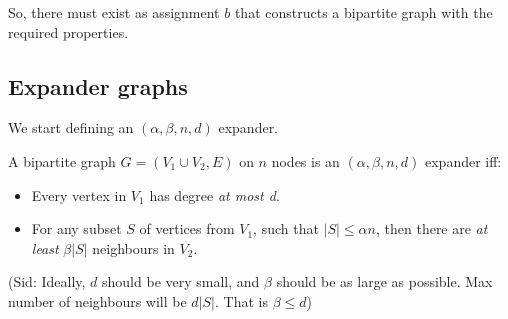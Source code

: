 So, there must exist as assignment $b$ that constructs a bipartite graph
with the required properties.

\subsection{Expander graphs}
We start defining an $(\alpha, \beta, n, d)$ expander.

A bipartite graph $G = (V_1 \cup V_2, E)$ on $n$ nodes is an $(\alpha, \beta, n, d)$
expander iff:
\begin{itemize}
\item Every vertex in $V_1$ has degree \textit{at most d}.
\item For any subset $S$ of vertices from $V_1$, such that $|S| \leq \alpha n$, 
then there are \textit{at least} $\beta |S|$ neighbours in $V_2$.
\end{itemize}

(Sid: Ideally, $d$ should be very small, and $\beta$ should be as large as possible.
Max number of neighbours will be $d |S|$. That is $\beta \leq d$)
